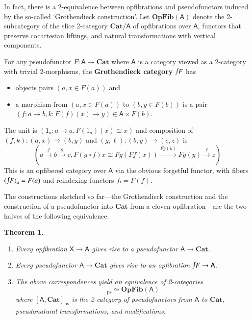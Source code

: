 \documentclass[reqno]{amsart}
\let\maps\colon
\newtheorem{thm}{Theorem}[section]
\theoremstyle{definition}
\theoremstyle{remark}
\newcommand{\A}{\mathsf{A}}
\newcommand{\X}{\mathsf{X}}
\newcommand{\bicat}{\mathbf}
\newcommand{\Cat}{\bicat{Cat}}
\newcommand{\OpFib}{\bicat{OpFib}}
\newcommand{\inta}{\raisebox{.3\depth}{$\smallint\hspace{-.01in}$}}
\newcommand{\pse}{\mathrm{ps}}
\begin{document}
In fact, there is a 2-equivalence between opfibrations and pseudofunctors induced by the so-called `Grothendieck construction'.  Let $\OpFib(\A)$ denote the 2-subcategory of the slice 2-category $\Cat/ \A$ of opfibrations over $\A$, functors that preserve cocartesian liftings, and natural transformations with vertical components.  
\begin{defn}\label{def:GrothCat}
For any pseudofunctor $F\maps\A\to\Cat$ where $\A$ is a category viewed as a 2-category with trivial 2-morphisms, the \textbf{Grothendieck category}
$\inta F$ has
\begin{itemize}
\item objects pairs $(a, x \in F(a))$ and
\item a morphism from $(a, x \in F(a))$ to $(b, y\in F(b))$ is a pair $(f \maps a \to b,k \maps F(f)(x) \to y)\in\A\times F(b)$.
\end{itemize}
The unit is $(1_a\maps a\to a,F(1_a)(x)\cong x)$ and composition of $(f,k)\maps(a,x)\to(b,y)$ and $(g,\ell)\maps(b,y)\to(c,z)$ is
\begin{equation}\label{eq:compGrothcat}
\left(a\xrightarrow{f}b\xrightarrow{g}c, F(g\circ f)x\cong Fg(Ff(x))\xrightarrow{Fg(k)}Fg(y)\xrightarrow{\ell}z\right) 
\end{equation}
This is an opfibered category over $\A$ via the obvious forgetful functor, with fibers $(\inta F)_a=F(a)$ and reindexing functors $f_!=F(f)$.
\end{defn}
The constructions sketched so far---the Grothendieck construction and the construction of a pseudofunctor into $\Cat$ from a cloven opfibration---are the two halves of the following equivalence.

\begin{thm}\label{thm:Grothendieck}\hfill
\begin{enumerate}
\item Every opfibration $\X \to \A$ gives rise to a pseudofunctor $\A \to \Cat$.
\item Every pseudofunctor $\A \to \Cat$ gives rise to an opfibration $\inta F \to\A$.
\item The above correspondences yield an equivalence of 2-categories 
\begin{displaymath}
[\A,\Cat]_\pse \simeq \OpFib(\A)
\end{displaymath}
where $[\A,\Cat]_\pse$ is the 2-category of pseudofunctors from $\A$ to $\Cat$, pseudonatural transformations, and modifications.
\end{enumerate}
\end{thm}
\end{document}
